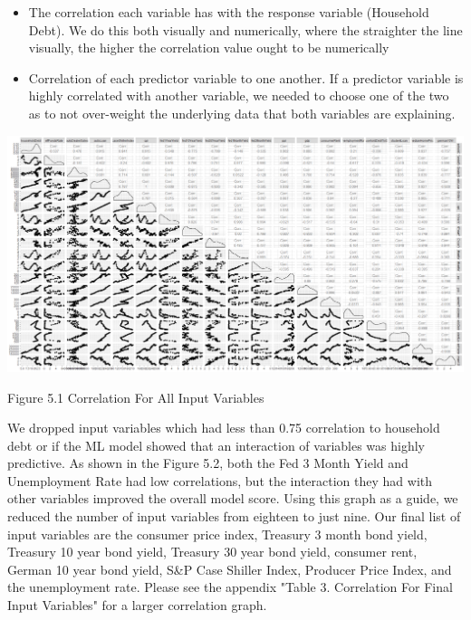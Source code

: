 \documentclass[sigconf,nonacm,11pt]{acmart}
\begin{document}
\begin{itemize}

\item The correlation each variable has with the response variable (Household Debt).  We do this both visually and numerically, where the straighter the line visually, the higher the correlation value ought to be numerically

\item Correlation of each predictor variable to one another.  If a predictor variable is highly correlated with another variable, we needed to choose one of the two as to not over-weight the underlying data that both variables are explaining.

\end{itemize}

\vspace{0.5em}
\includegraphics[scale = 0.12]{Correlation_Plot_All.png}

Figure 5.1 Correlation For All Input Variables
\vspace{0.75em}

We dropped input variables which had less than 0.75 correlation to household debt or if the ML model showed that an interaction of variables was highly predictive. As shown in the Figure 5.2, both the Fed 3 Month Yield and Unemployment Rate had low correlations, but the interaction they had with other variables improved the overall model score. Using this graph as a guide, we reduced the number of input variables from eighteen to just nine. Our final list of input variables are the consumer price index, Treasury 3 month bond yield, Treasury 10 year bond yield, Treasury 30 year bond yield, consumer rent, German 10 year bond yield, S&P Case Shiller Index, Producer Price Index, and the unemployment rate. Please see the appendix "Table 3. Correlation For Final Input Variables" for a larger correlation graph.
\end{document}
